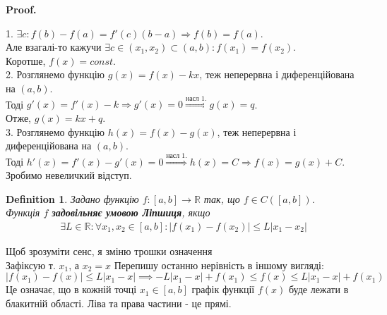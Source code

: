 \documentclass[a4paper, 14pt]{article}
\makeatletter
\def\qed{$\blacksquare$}
\theoremstyle{theoremdd}
\theoremstyle{theoremdd}
\newtheorem{definition}[theorem]{Definition}
\theoremstyle{theoremdd}
\theoremstyle{theoremdd}
\theoremstyle{theoremdd}
\theoremstyle{theoremdd}
\theoremstyle{theoremdd}
\theoremstyle{theoremdd}
\renewenvironment{proof}[1][Proof.\\]{\par
\pushQED{\hfill \qed}%
\normalfont \topsep6\p@\@plus6\p@\relax
\trivlist
\item\relax
{\bfseries
#1\@addpunct{.}}\hspace\labelsep\ignorespaces
}{%
\popQED\endtrivlist\@endpefalse
}
\makeatother
\begin{document}
\begin{proof}
1. $\exists c: f(b)-f(a) = f'(c)(b-a) \Rightarrow f(b) = f(a)$.\\
Але взагалі-то кажучи $\exists c \in (x_1,x_2) \subset (a,b): f(x_1) = f(x_2)$.\\
Коротше, $f(x) = const$.
\bigskip \\

2. Розглянемо функцію $g(x) = f(x) - kx$, теж неперервна і диференційована на $(a,b)$.\\
Тоді $g'(x) = f'(x) - k \Rightarrow g'(x) = 0 \overset{\textrm{насл 1.}}{\Rightarrow} g(x) = q$.\\
Отже, $g(x) = kx + q$.
\bigskip \\

3. Розглянемо функцію $h(x) = f(x) - g(x)$, теж неперервна і диференційована на $(a,b)$.\\
Тоді $h'(x) = f'(x) - g'(x) = 0 \overset{\textrm{насл 1.}}{\Rightarrow} h(x) = C \Rightarrow f(x) = g(x) + C$.
\bigskip \\

Зробимо невеличкий відступ.
\begin{definition}
Задано функцію $f: [a,b] \to \mathbb{R}$ так, що $f \in C([a,b])$.\\
Функція $f$ \textbf{задовільняє умовою Ліпшиця}, якщо
\begin{align*}
\exists L \in \mathbb{R}: \forall x_1,x_2 \in [a,b]: |f(x_1)-f(x_2)| \leq L|x_1-x_2|
\end{align*}
\end{definition}
Щоб зрозуміти сенс, я зміню трошки означення\\
Зафіксую т. $x_1$, а $x_2 = x$ Перепишу останню нерівність в іншому вигляді:\\
$|f(x_1)-f(x)| \leq L|x_1-x| \implies -L|x_1-x|+f(x_1) \leq f(x) \leq L|x_1-x|+f(x_1) $\\
Це означає, що в кожній точці $x_1 \in [a,b]$ графік функції $f(x)$ буде лежати в блакитній області. Ліва та права частини - це прямі.
\begin{figure}[H]
\centering
{}
\end{figure}


\end{proof}
\end{document}
